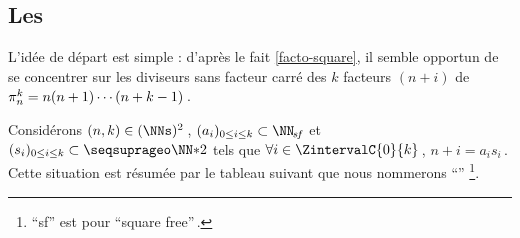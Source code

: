

\subsection{Les \sftab[x]}

\leavevmode
\smallskip

L'idée de départ est simple : d'après le fait \ref{facto-square}, il semble opportun de se concentrer sur les diviseurs sans facteur carré des $k$ facteurs $(n + i)$ de $\consprod = n (n + 1) \cdots (n + k - 1)$\,.




\begin{defi}
	Considérons $(n, k) \in ( \NNs )^2$\,,
	$( a_i )_{0 \leq i \leq k} \subset \NNsf$
	et
	$( s_i )_{0 \leq i \leq k} \subset \NNssquare$
	tels que
	$\forall i \in \ZintervalC{0}{k}$\,, $n + i = a_i s_i$\,.
	Cette situation est résumée par le tableau suivant que nous nommerons \enquote{\sftab}
	\footnote{
		\enquote{sf} est pour \enquote{square free}\,.
	}.

	\begin{center}
	\end{center}
\end{defi}




